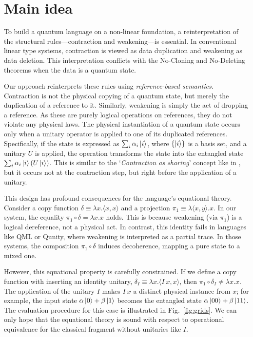 
\section{Main idea} \label{sec:main-idea}
To build a quantum language on a non-linear foundation, a reinterpretation of the structural rules---contraction and weakening---is essential.
In conventional linear type systems, contraction is viewed as data duplication and weakening as data deletion.
This interpretation conflicts with the No-Cloning and No-Deleting theorems when the data is a quantum state.

Our approach reinterprets these rules using \textit{reference-based semantics}.
Contraction is not the physical copying of a quantum state, but merely the duplication of a reference to it.
Similarly, weakening is simply the act of dropping a reference.
As these are purely logical operations on references, they do not violate any physical laws.
The physical instantiation of a quantum state occurs only when a unitary operator is applied to one of its duplicated references.
Specifically, if the state is expressed as $\sum_i\alpha_i\ket{i}$, where $\{\ket{i}\}$ is a basis set, and a unitary $U$ is applied, the operation transforms the state into the entangled state $\sum_i\alpha_i\ket{i}(U\ket{i})$.
This is similar to the `\textit{Contraction as sharing}' concept like in \cite{ALTENKIRCH2005_FunctionalQuantumProgramming,ARRIGHI2004_OperationalSemanticsFormal}, but it occurs not at the contraction step, but right before the application of a unitary.

This design has profound consequences for the language's equational theory.
Consider a copy function $\delta \equiv \lambda x.\langle x,x\rangle$ and a projection $\pi_1 \equiv \lambda\langle x,y\rangle.x$. In our system, the equality $\pi_1\circ\delta=\lambda x. x$ holds.
This is because weakening (via $\pi_1$) is a logical dereference, not a physical act.
In contrast, this identity fails in languages like QML\cite{ALTENKIRCH2005_FunctionalQuantumProgramming} or Qunity\cite{VOICHICK2023_QunityUnifiedLanguage}, where weakening is interpreted as a partial trace.
In those systems, the composition $\pi_1\circ\delta$ induces decoherence, mapping a pure state to a mixed one.

However, this equational property is carefully constrained.
If we define a copy function with inserting an identity unitary, $\delta_I \equiv \lambda x.\langle I\ x,x\rangle$, then $\pi_1\circ\delta_I\ne\lambda x.x$.
The application of the unitary $I$ makes $I\ x$ a distinct physical instance from $x$; for example, the input state $\alpha\ket{0}+\beta\ket{1}$ becomes the entangled state $\alpha\ket{00}+\beta\ket{11}$.
The evaluation procedure for this case is illustrated in Fig.~\ref{fig:grids}.
We can only hope that the equational theory is sound with respect to operational equivalence for the classical fragment without unitaries like $I$.

